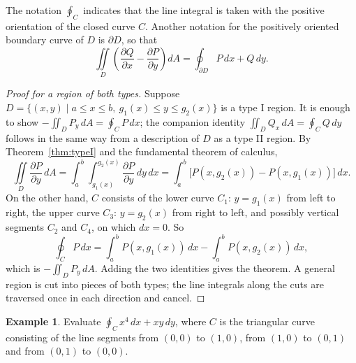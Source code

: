 \documentclass[11pt,a4paper]{article}
\theoremstyle{definition}
\newtheorem{exa}[thm]{Example}
\begin{document}
The notation $\oint_C$ indicates that the line integral is taken with the
positive orientation of the closed curve $C$. Another notation for the
positively oriented boundary curve of $D$ is $\partial D$, so that
\[\iint\limits_D \left( \frac{\partial Q}{\partial x} - \frac{\partial P}{\partial
y}\right) dA = \oint_{\partial D} P \,dx + Q \, dy .\]

\begin{proof}[Proof for a region of both types]
Suppose $D = \{(x,y) \mid a\leq x\leq b,\ g_1(x)\leq y\leq g_2(x)\}$ is a type I
region. It is enough to show
$-\iint_D P_y\,dA = \oint_C P\,dx$; the companion identity
$\iint_D Q_x\,dA = \oint_C Q\,dy$ follows in the same way from a description of
$D$ as a type II region. By Theorem~\ref{thm:typeI} and the fundamental theorem
of calculus,
\[\iint\limits_D \frac{\partial P}{\partial y}\,dA = \int_a^b\int_{g_1(x)}^
{g_2(x)}\frac{\partial P}{\partial y}\,dy\,dx = \int_a^b\big[P(x,g_2(x)) -
P(x,g_1(x))\big]\,dx .\]
On the other hand, $C$ consists of the lower curve $C_1$: $y = g_1(x)$ from left
to right, the upper curve $C_3$: $y = g_2(x)$ from right to left, and possibly
vertical segments $C_2$ and $C_4$, on which $dx = 0$. So
\[\oint_C P\,dx = \int_a^b P(x, g_1(x))\,dx - \int_a^b P(x, g_2(x))\,dx ,\]
which is $-\iint_D P_y\,dA$. Adding the two identities gives the theorem. A
general region is cut into pieces of both types; the line integrals along the
cuts are traversed once in each direction and cancel.
\end{proof}

\begin{exa}
\label{ex:greentriangle}
Evaluate $\oint_C x^4\,dx + xy\,dy$, where $C$ is the triangular curve consisting
of the line segments from $(0,0)$ to $(1,0)$, from $(1,0)$ to $(0,1)$ and from
$(0,1)$ to $(0,0)$.

\begin{figure}[H]
\centering
{}
\end{figure}
\end{exa}
\end{document}
